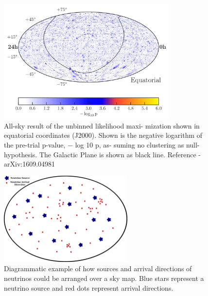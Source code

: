 \documentclass[a4paper,12pt,twoside,openright]{article}
\begin{document}
\begin{figure}[!h]
\centering
\includegraphics[width=0.8\textwidth]{ICECUBE_eventmap.png}
\caption{All-sky result of the unbinned likelihood maxi-
mization shown in equatorial coordinates (J2000). Shown is
the negative logarithm of the pre-trial p-value, − log 10 p, as-
suming no clustering as null-hypothesis. The Galactic Plane
is shown as black line. Reference - arXiv:1609.04981
}
\end{figure}

\begin{figure}[!h]
\centering
\includegraphics[width=0.6\textwidth]{MockNeutrinoMap.png}
\caption{Diagrammatic example of how sources and arrival directions of neutrinos could be arranged over a sky map. Blue stars represent a neutrino source and red dots represent arrival directions.}
\end{figure}
\end{document}
